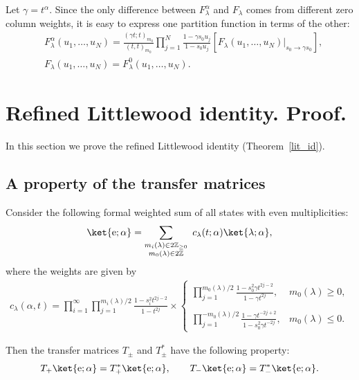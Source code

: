 Let $\gamma = t^{\alpha}$. Since the only difference between $F^{\alpha}_\lambda$ and $F_\lambda$ comes from different zero column weights, it is easy to express one partition function in terms of the other: 
\begin{equation}
\label{F_alpha}
\begin{split}
&F^{\alpha}_\lambda(u_1, \dots, u_N) = \frac{(\gamma t; t)_{m_0}}{( t, t)_{m_0}} \prod_{j=1}^{N} \frac{1 - \gamma s_0 u_j}{1 - s_0 u_j}
\left[ F_{\lambda}(u_1, \dots, u_N)
\Big\vert_{\text{$s_0\to \gamma s_0$}}\right],\\
&F_{\lambda}(u_1, \dots, u_N) = F^{0}_{\lambda}(u_1, \dots, u_N).
\end{split}
\end{equation}

\section{Refined Littlewood identity. Proof.}
\label{sec:sHL_proof}

In this section we prove the refined Littlewood identity (Theorem~\ref{lit_id}).
\subsection{A property of the transfer matrices}
\begin{lemma} \label{lem_T_op}
	Consider the following formal weighted sum of all states with even multiplicities:
	\begin{align*}
	\label{e-vect}
	\ket{\rm e;\alpha}
	=
	\sum_{\substack{
			m_{i}(\lambda) \in 2 \mathbb{Z}_{\geq 0} \\ m_0(\lambda) \in 2 \mathbb{Z} 
	}}
	\
	c_{\lambda}(t; \alpha)
	\ket{\lambda;\alpha},
	\end{align*}
	where the weights are given by
	\begin{align*}
	c_{\lambda}(\alpha,t) 
	= 
	\prod_{i = 1}^{\infty} \prod_{j = 1}^{m_{i}(\lambda) / 2} \frac{1 - s_{i}^2 t^{2j - 2}}{1 - t^{2j}}
	\times
	\left\{
	\begin{array}{cl}
	\displaystyle{
		\prod_{j = 1}^{m_{0}(\lambda) / 2} \frac{1 - s_{0}^2 \gamma t^{2j - 2}}{1 - \gamma t^{2j}}
	},
	&
	m_0(\lambda) \geq 0,
	\\ \\ 
	\displaystyle{
		\prod_{j=1}^{-m_0(\lambda)/2}
		\frac{1 - \gamma t^{-2j+2}}{1 - s_{0}^2 \gamma t^{-2j}}
	},
	&
	m_0(\lambda) \leq 0.
	\end{array}
	\right.
	\end{align*}
	
	Then the transfer matrices $T_{\pm}$ and $T^{*}_{\pm}$ have the following property:
	\begin{equation} \label{eq: lem_T_op}
	T_{+}\ket{\rm e;\alpha} = T^{*}_{+}\ket{\rm e;\alpha}, \quad\quad T_{-}\ket{\rm e;\alpha} = T^{*}_{-}\ket{\rm e;\alpha}.
	\end{equation}
\end{lemma}




